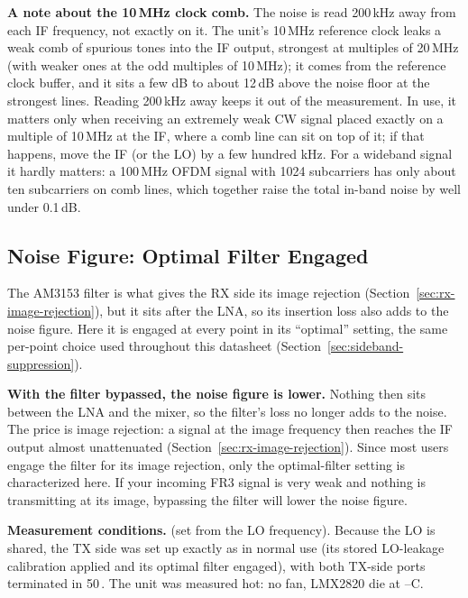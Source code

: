 \textbf{A note about the 10\,MHz clock comb.} The noise is read 200\,kHz away from each IF frequency, not exactly on
it. The unit's 10\,MHz reference clock leaks a weak comb of spurious tones into the IF output, strongest at
multiples of 20\,MHz (with weaker ones at the odd multiples of 10\,MHz); it comes from the reference clock buffer,
and it sits a few dB to about 12\,dB above the noise floor at the strongest lines.
Reading 200\,kHz away keeps it out of the measurement. In use, it matters only when receiving an extremely weak CW
signal placed exactly on a multiple of 10\,MHz at the IF, where a comb line can sit on top of it; if that happens,
move the IF (or the LO) by a few hundred kHz. For a wideband signal it hardly matters: a 100\,MHz OFDM signal with
1024 subcarriers has only about ten subcarriers on comb lines, which together raise the total in-band noise by well
under 0.1\,dB.

\subsection{Noise Figure: Optimal Filter Engaged}
\label{sec:nf-optimal}

The AM3153 filter is what gives the RX side its image rejection (Section~\ref{sec:rx-image-rejection}), but it sits
after the LNA, so its insertion loss also adds to the noise figure. Here it is engaged at every point in its ``optimal''
setting, the same per-point choice used throughout this datasheet (Section~\ref{sec:sideband-suppression}).

\textbf{With the filter bypassed, the noise figure is lower.} Nothing then sits between the LNA and the mixer, so the
filter's loss no longer adds to the noise. The price is image rejection: a signal at the image frequency then reaches
the IF output almost unattenuated (Section~\ref{sec:rx-image-rejection}). Since most users engage the filter for its
image rejection, only the optimal-filter setting is characterized here. If your incoming FR3 signal is very weak and
nothing is transmitting at its image, bypassing the filter will lower the noise figure.

\textbf{Measurement conditions.} \lmxDriveRule{} (set from the LO frequency). Because the LO is shared, the TX side
was set up exactly as in normal use (its stored LO-leakage calibration applied and its optimal filter engaged), with
both TX-side ports terminated in 50\,\textohm. The unit was measured hot: no fan, LMX2820 die at
\condRxNfMinC--\condRxNfMaxC\textdegree C.

